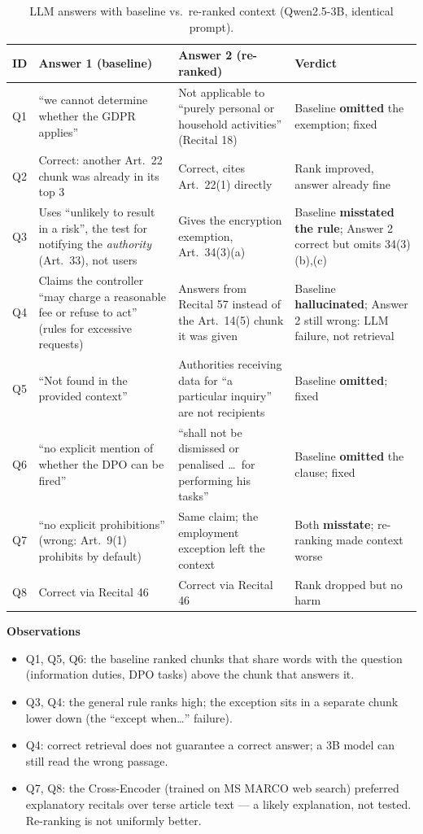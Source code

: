 \documentclass[11pt,a4paper]{article}
\newenvironment{observations}
  {\par\smallskip\noindent\textbf{Observations}\begin{itemize}}
  {\end{itemize}\smallskip}
\begin{document}
\begin{table}[H]
\centering\footnotesize
\begin{tabularx}{\linewidth}{l L L L}
\toprule
\textbf{ID} & \textbf{Answer 1 (baseline)} & \textbf{Answer 2 (re-ranked)} & \textbf{Verdict} \\
\midrule
Q1 & ``we cannot determine whether the GDPR applies'' & Not applicable to ``purely personal or household activities'' (Recital 18) & Baseline \textbf{omitted} the exemption; fixed \\
Q2 & Correct: another Art.\ 22 chunk was already in its top 3 & Correct, cites Art.\ 22(1) directly & Rank improved, answer already fine \\
Q3 & Uses ``unlikely to result in a risk'', the test for notifying the \emph{authority} (Art.\ 33), not users & Gives the encryption exemption, Art.\ 34(3)(a) & Baseline \textbf{misstated the rule}; Answer 2 correct but omits 34(3)(b),(c) \\
Q4 & Claims the controller ``may charge a reasonable fee or refuse to act'' (rules for excessive requests) & Answers from Recital 57 instead of the Art.\ 14(5) chunk it was given & Baseline \textbf{hallucinated}; Answer 2 still wrong: LLM failure, not retrieval \\
Q5 & ``Not found in the provided context'' & Authorities receiving data for ``a particular inquiry'' are not recipients & Baseline \textbf{omitted}; fixed \\
Q6 & ``no explicit mention of whether the DPO can be fired'' & ``shall not be dismissed or penalised \ldots\ for performing his tasks'' & Baseline \textbf{omitted} the clause; fixed \\
Q7 & ``no explicit prohibitions'' (wrong: Art.\ 9(1) prohibits by default) & Same claim; the employment exception left the context & Both \textbf{misstate}; re-ranking made context worse \\
Q8 & Correct via Recital 46 & Correct via Recital 46 & Rank dropped but no harm \\
\bottomrule
\end{tabularx}
\caption{LLM answers with baseline vs.\ re-ranked context (Qwen2.5-3B, identical prompt).}
\end{table}

\begin{observations}
  \item Q1, Q5, Q6: the baseline ranked chunks that share words with the question (information duties, DPO
        tasks) above the chunk that answers it.
  \item Q3, Q4: the general rule ranks high; the exception sits in a separate chunk lower down (the
        ``except when\ldots'' failure).
  \item Q4: correct retrieval does not guarantee a correct answer; a 3B model can still read the wrong passage.
  \item Q7, Q8: the Cross-Encoder (trained on MS MARCO web search) preferred explanatory recitals over terse
        article text --- a likely explanation, not tested. Re-ranking is not uniformly better.
\end{observations}
\end{document}
